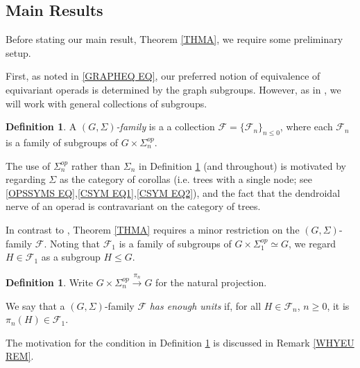 \documentclass[a4paper,10pt
 ,final
]{article}%
\numberwithin{equation}{section}
\numberwithin{figure}{section}
\theoremstyle{definition} %
\newtheorem{definition}[equation]{Definition}%
\newcommand{\F}{\ensuremath{\mathcal F}}
\newcommand{\1}{\ensuremath{\mathbbm 1}}%
\begin{document}
\subsection{Main Results}


Before stating our main result, Theorem \ref{THMA},
we require some preliminary setup.

First, as noted in \eqref{GRAPHEQ EQ},
our preferred notion of equivalence of equivariant operads is determined by the graph subgroups.
However, as in \cite{BP_FCOP}, we will work with general collections of subgroups.

\begin{definition}\label{FAM1ST DEF}
	A \emph{$(G,\Sigma)$-family} is a
	a collection
	$\mathcal{F} = \{\mathcal{F}_n\}_{n \leq 0}$,
	where each $\mathcal{F}_n$
	is a family of subgroups of $G \times \Sigma_n^{op}$.
\end{definition}
The use of $\Sigma_n^{op}$ rather than $\Sigma_n$
in Definition \ref{FAM1ST DEF} 
(and throughout) 
is motivated by regarding $\Sigma$
as the category of corollas (i.e. trees with a single node; 
see \eqref{OPSSYMS EQ},\eqref{CSYM EQ1},\eqref{CSYM EQ2}),
and the fact that the dendroidal nerve \cite[\S 1]{MW07} of an operad is contravariant on the category of trees.


In contrast to \cite[Thm. \ref{OC-THMI}]{BP_FCOP},
Theorem \ref{THMA} requires a minor restriction on the 
$(G,\Sigma)$-family $\mathcal{F}$.
Noting that $\F_1$ is a family of subgroups of 
$G \times \Sigma_1^{op} \simeq G$,
we regard 
$H \in \F_1$ as a subgroup $H \leq G$.

\begin{definition}\label{FAMRESUNI DEF}
	Write $G \times \Sigma_n^{op} \xrightarrow{\pi_n} 
	G$
	for the natural projection.
	
	We say that a $(G,\Sigma)$-family $\F$ 
	\emph{has enough units}	if,
	for all $H \in \F_n$, $n\geq 0$,
	it is $\pi_n(H) \in \F_1$.
\end{definition}
 The motivation for the condition
in Definition \ref{FAMRESUNI DEF} is discussed in Remark \ref{WHYEU REM}.
\end{document}
